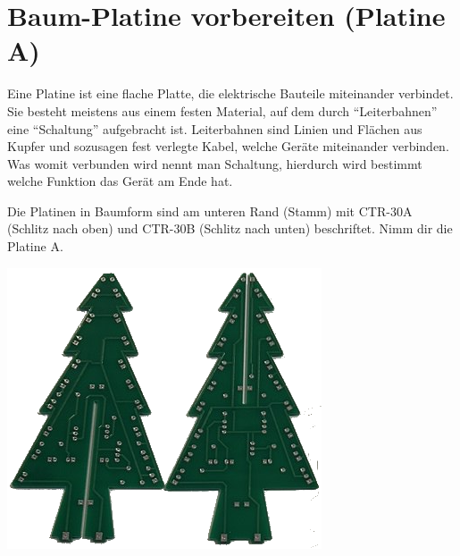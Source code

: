 \documentclass[10pt]{article}
\begin{document}
	\section{Baum-Platine vorbereiten (Platine A)}
	\begin{minipage}{0.85\textwidth}
		Eine Platine ist eine flache Platte, die elektrische Bauteile miteinander verbindet. Sie besteht meistens aus einem festen Material, auf dem durch \enquote{Leiterbahnen} eine \enquote{Schaltung} aufgebracht ist. Leiterbahnen sind Linien und Flächen aus Kupfer und sozusagen fest verlegte Kabel, welche Geräte miteinander verbinden. Was womit verbunden wird nennt man Schaltung, hierdurch wird bestimmt welche Funktion das Gerät am Ende hat.
	
		Die Platinen in Baumform sind am unteren Rand (Stamm) mit CTR-30A (Schlitz nach oben) und CTR-30B (Schlitz nach unten) beschriftet. Nimm dir die Platine A.
	\end{minipage}
	\begin{minipage}{0.15\textwidth}\raggedleft
	\includegraphics[width=\linewidth]{pcb-tree.png}
	\end{minipage}
	
\end{document}
